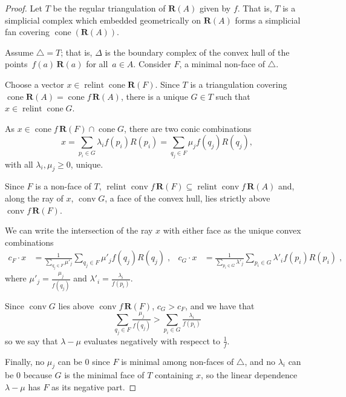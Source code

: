 \documentclass{amsart}
\theoremstyle{definition}
\renewcommand{\b}[1]{{\boldsymbol{#1}}} %
\newcommand{\simplex}{\b{\triangle}} %
\DeclareMathOperator{\conv}{conv} %
\DeclareMathOperator{\relint}{relint} %
\DeclareMathOperator{\cone}{cone} %
\newcommand{\paco}[1]{\todo[size=\scriptsize, color=orange!30]{\rm #1 \\ \hfill --- P.}}
\begin{document}
\begin{proof}
  Let $T$ be the regular triangulation of $\b{R}(A)$ given by $f$.
  That is, $T$ is a simplicial complex which embedded geometrically on $\b{R}(A)$ forms a simplicial fan covering $\cone(\b{R}(A))$.
  
  Assume $\simplex=T$; that is, $\Delta$ is the boundary complex of the convex hull of
  the points~$f(a) \, \b{R}(a)$ for all~$a\in A$.
  Consider $F$, a minimal non-face of $\simplex$.

  Choose a vector $x\in \relint{\cone{\b{R}(F)}}$.
  Since $T$ is a triangulation covering $\cone{\b{R}(A)} = \cone{f\, \b{R}(A)}$,
  there is a unique $G\in T$ such that $x\in \relint{\cone{G}}$.

  As $x\in \cone{f\, \b{R}(F)} \cap \cone{G}$, there are two conic combinations
  \[
    x = \sum_{p_i\in G} \lambda_i f(p_i) R(p_i) = \sum_{q_j\in F} \mu_j f(q_j) R(q_j),
  \]
  with all $\lambda_i, \mu_j \geq 0$, unique.

  Since $F$ is a non-face of $T$, $\relint{\conv{f\, \b{R}(F)}} \subseteq \relint{\conv{f\, \b{R}(A)}}$
  and, along the ray of $x$, $\conv{G}$, a face of the convex hull, lies
  strictly above $\conv{f\, \b{R}(F)}$.

  We can write the intersection of the ray $x$ with either face as
  the unique convex combinations
  \begin{align*}
    c_F\cdot x &= \tfrac{1}{\sum_{q_j\in F} \mu'_j}     \sum_{q_j\in F} \mu'_j     f(q_j) R(q_j)\;, &
    c_G\cdot x &= \tfrac{1}{\sum_{p_i\in G} \lambda'_j} \sum_{p_i\in G} \lambda'_i f(p_i) R(p_i)\;,
  \end{align*}
  where $\mu'_j = \tfrac{\mu_j}{f(q_j)}$ and $\lambda'_i = \tfrac{\lambda_i}{f(p_i)}$.

  Since $\conv{G}$ lies above $\conv{f\, \b{R}(F)}$, $c_G > c_F$, and we have that
  \[
    \sum_{q_j\in F} \tfrac{\mu_j}{f(q_j)} > \sum_{p_i\in G} \tfrac{\lambda_i}{f(p_i)}
  \]
  so we say that $\lambda - \mu$ evaluates negatively with respecct to $\tfrac{1}{f}$.

  Finally, no $\mu_j$ can be $0$ since $F$ is minimal among non-faces of $\simplex$,
  and no $\lambda_i$ can be $0$ because $G$ is the minimal face of $T$ containing $x$,
  so the linear dependence $\lambda - \mu$ has $F$ as its negative part.
  

\end{proof}
\end{document}
